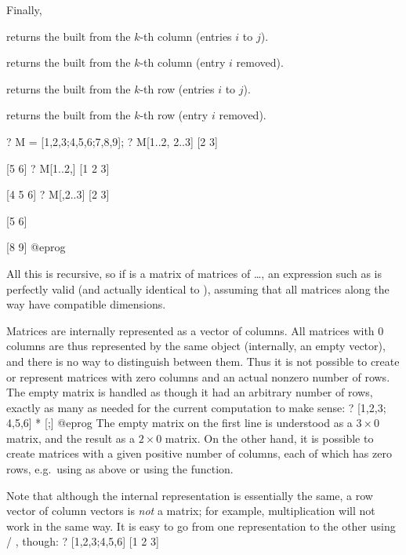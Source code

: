 \noindent Finally,

\item {} returns the  built from the $k$-th column
  (entries $i$ to $j$).

\item {} returns the  built from the $k$-th column
  (entry $i$ removed).

\item {} returns the  built from the $k$-th row
  (entries $i$ to $j$).

\item {} returns the  built from the $k$-th row
  (entry $i$ removed).

\bprog
? M = [1,2,3;4,5,6;7,8,9];
? M[1..2, 2..3]
[2 3]

[5 6]
? M[1..2,]
[1 2 3]

[4 5 6]
? M[,2..3]
[2 3]

[5 6]

[8 9]
@eprog

All this is recursive, so if  is a matrix of matrices of \dots, an
expression such as  is perfectly valid (and actually
identical to ), assuming that all matrices along the way
have compatible dimensions.

 Matrices are internally represented
as a vector of columns. All matrices with $0$ columns are thus represented
by the same object (internally, an empty vector), and there is no way to
distinguish between them. Thus it is not possible to create or represent
matrices with zero columns and an actual nonzero number of rows.
The empty matrix \kbd{[;]} is handled as though it had an arbitrary number of
rows, exactly as many as needed for the current computation to make sense:
\bprog
? [1,2,3; 4,5,6] * [;]
@eprog\noindent
The empty matrix on the first line is understood as a $3\times 0$ matrix, and
the result as a $2\times 0$ matrix. On the other hand, it is possible to
create matrices with a given positive number of columns, each of which has
zero rows, e.g.~using  as above or using the  function.

Note that although the internal representation is essentially the same, a row
vector of column vectors is \emph{not} a matrix; for example, multiplication
will not work in the same way. It is easy to go from one representation to
the other using  / , though:
\bprog
? [1,2,3;4,5,6]
[1 2 3]

